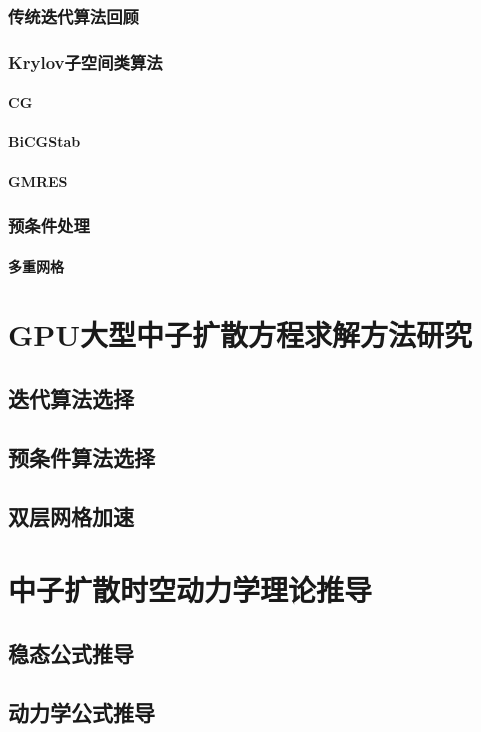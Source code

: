 \documentclass[master,xetex]{thuthesis}
\begin{document}
\subsection{传统迭代算法回顾}
\subsection{Krylov子空间类算法}
\subsubsection{CG}
\subsubsection{BiCGStab}
\subsubsection{GMRES}
\subsection{预条件处理}
\subsubsection{多重网格}

\chapter{GPU大型中子扩散方程求解方法研究}
\section{迭代算法选择}
\section{预条件算法选择}
\section{双层网格加速}

\chapter{中子扩散时空动力学理论推导}
\section{稳态公式推导}
\section{动力学公式推导}
\end{document}
